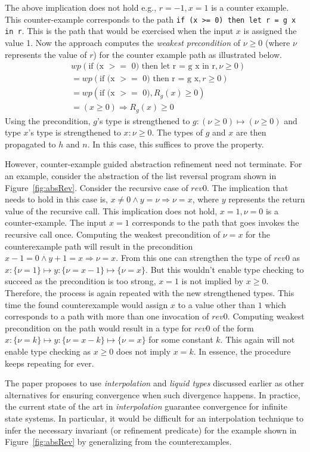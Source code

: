 The above implication does not hold e.g., $r = -1, x =1$ is a counter example.
This counter-example corresponds to the path \texttt{if (x >= 0) then let r = g x in r}.
This is the path that would be exercised when the input $x$ is assigned the value 1.
Now the approach computes the \emph{weakest precondition} of $\nu \ge 0$ (where $\nu$ represents 
the value of $r$) for the counter example path as illustrated below.
%
\begin{align*}
& wp(\text{if (x $>=$ 0) then let r = g x in r}, \nu \ge 0) \\
& = wp(\text{if (x $>=$ 0) then r = g x}, r \ge 0)\\
& = wp(\text{if (x $>=$ 0)}, R_g(x) \ge 0) \\
& = (x \ge 0) \Rightarrow R_g(x) \ge 0
\end{align*}
%
Using the precondition, $g$'s type is strengthened to $g: (\nu \ge 0) \mapsto (\nu \ge 0)$ and 
type $x$'s type is strengthened  to $x: \nu \ge 0$. The types of $g$ and $x$ are then propagated to $h$ and $n$.
In this case, this suffices to prove the property.

However, counter-example guided abstraction refinement need not terminate. For an example, consider the 
abstraction of the list reversal program shown in Figure~\ref{fig:absRev}.
Consider the recursive case of $rev0$. The implication that needs to hold in this case is,
$x \ne 0 \wedge y = \nu \Rightarrow \nu = x$, where $y$ represents the return 
value of the recursive call.
This implication does not hold, $x = 1,\nu = 0$ is a counter-example.
The input $x = 1$ corresponds to the path that goes invokes the recursive call once. 
Computing the weakest precondition of $\nu = x$ for the counterexample path will result in the 
precondition $x - 1 = 0 \wedge y + 1 = x \Rightarrow \nu = x$. From this one can strengthen
the type of $rev0$ as $x:\{ \nu = 1 \} \mapsto y:\{ \nu = x - 1 \} \mapsto \{\nu = x \}$.
But this wouldn't enable type checking to succeed as the precondition is too strong, 
$x = 1$ is not implied by $x \ge 0$. 
Therefore, the process is again repeated with the  new strengthened types. This time
the found counterexample would assign $x$ to a value other than $1$ which corresponds 
to a path with more than one invocation of $rev0$. Computing weakest precondition on the path
would result in a type for $rev0$ of the form  
$x:\{ \nu = k \} \mapsto y:\{ \nu = x - k \} \mapsto \{\nu = x \}$  for some constant $k$.
This again will not enable type checking as $x \ge 0$ does not imply $x = k$.
In essence, the procedure keeps repeating for ever.

The paper proposes to use \emph{interpolation} and \emph{liquid types} \cite{rjhala:PLDI08} 
discussed earlier as other alternatives for ensuring convergence when such divergence happens. 
In practice, the current state of the art in \emph{interpolation} guarantee convergence for
infinite state systems. In particular, it would be difficult for an interpolation technique 
to infer the necessary invariant (or refinement predicate) for the example shown in Figure~\ref{fig:absRev}
by generalizing from the counterexamples.







